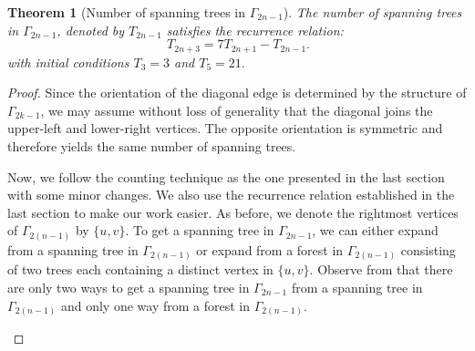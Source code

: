 \documentclass{amsart}
\newtheorem{theorem}{Theorem}[section]
\theoremstyle{definition}
\begin{document}
\begin{theorem}[Number of spanning trees in $\Gamma_{2n - 1}$]\label{thm:sthomogenousodd}
The number of spanning trees in $\Gamma_{2n - 1}$, denoted by $T_{2n - 1}$ satisfies the recurrence relation: 
\[\ T_{2n+3} = 7T_{2n+1} - T_{2n - 1}.\]
with initial conditions $T_3 = 3$ and $T_5 = 21.$
\end{theorem}
\begin{proof} 
    \par %
    Since the orientation of the diagonal edge is determined by the structure of $\Gamma_{2k-1}$, we may assume without loss of generality that the diagonal joins the upper-left and lower-right vertices. The opposite orientation is symmetric and therefore yields the same number of spanning trees.
    \par
    Now, we follow the counting technique as the one presented in the last section with some minor changes. We also use the recurrence relation established in the last section to make our work easier. As before, we denote the rightmost vertices of $\Gamma_{2(n - 1)}$ by $\{u, v\}$. To get a spanning tree in $\Gamma_{2n - 1}$, we can either expand from a spanning tree in $\Gamma_{2(n - 1)}$ or expand from a forest in $\Gamma_{2(n - 1)}$ consisting of two trees each containing a distinct vertex in $\{u, v\}$. Observe from  that there are only two ways to get a spanning tree in $\Gamma_{2n - 1}$ from a spanning tree in $\Gamma_{2(n - 1)}$ and only one way  from a forest in $\Gamma_{2(n - 1)}$.


    \begin{figure}[htbp]
        \centering
\end{figure}
\end{proof}
\end{document}
